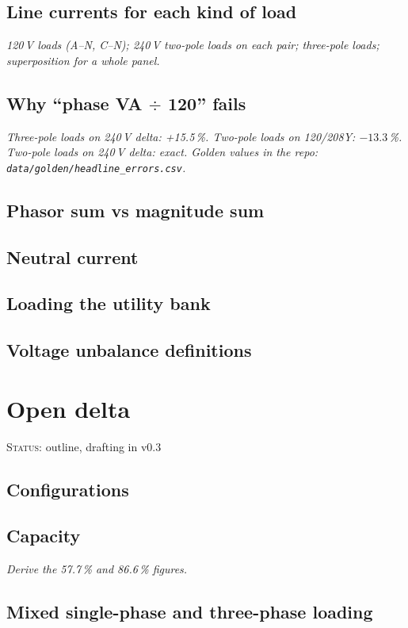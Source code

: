 \documentclass[11pt,a4paper]{article}
\newcommand{\plan}[1]{\par{\small\color{gray}\itshape #1}\par}
\newcommand{\status}[1]{{\small\color{orange!80!black}\textsc{Status:} #1}\par\medskip}
\begin{document}

\subsection{Line currents for each kind of load}
\plan{120\,V loads (A--N, C--N); 240\,V two-pole loads on each pair; three-pole loads; superposition for a whole panel.}
\subsection{Why ``phase VA $\div$ 120'' fails}
\plan{Three-pole loads on 240\,V delta: +15.5\,\%. Two-pole loads on 120/208Y: $-13.3$\,\%. Two-pole loads on 240\,V delta: exact. Golden values in the repo: \texttt{data/golden/headline\_errors.csv}.}
\subsection{Phasor sum vs magnitude sum}
\subsection{Neutral current}
\subsection{Loading the utility bank}
\subsection{Voltage unbalance definitions}

\section{Open delta}\label{sec:open-delta}
\status{outline, drafting in v0.3}
\subsection{Configurations}
\subsection{Capacity}
\plan{Derive the 57.7\,\% and 86.6\,\% figures.}
\subsection{Mixed single-phase and three-phase loading}
\end{document}

